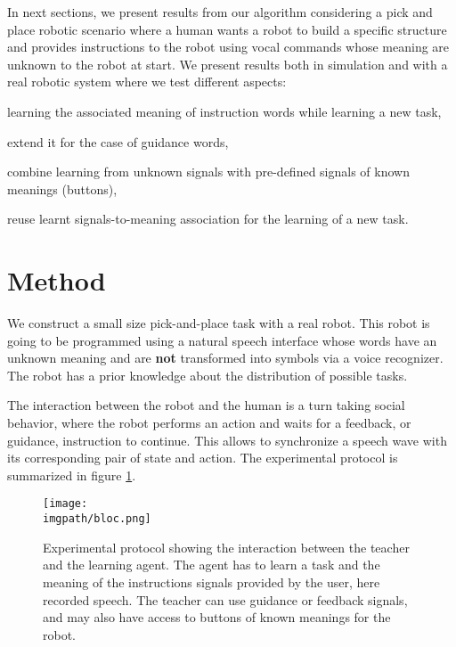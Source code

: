 In next sections, we present results from our algorithm considering a pick and place robotic scenario where a human wants a robot to build a specific structure and provides instructions to the robot using vocal commands whose meaning are unknown to the robot at start. We present results both in simulation and with a real robotic system where we test different aspects: \begin{inparaenum}[a)] \item learning the associated meaning of instruction words while learning a new task, \item extend it for the case of guidance words, \item combine learning from unknown signals with pre-defined signals of known meanings (buttons), \item reuse learnt signals-to-meaning association for the learning of a new task. \end{inparaenum}

\section{Method}

We construct a small size pick-and-place task with a real robot. This robot is going to be programmed using a natural speech interface whose words have an unknown meaning and are \textbf{not} transformed into symbols via a voice recognizer. The robot has a prior knowledge about the distribution of possible tasks.

The interaction between the robot and the human is a turn taking social behavior, where the robot performs an action and waits for a feedback, or guidance, instruction to continue. This allows to synchronize a speech wave with its corresponding pair of state and action. The experimental protocol is summarized in figure \ref{fig:lfui:bloc}.

\begin{figure}[!ht]
  \centering
  \texttt{[image: \\imgpath/bloc.png]}
  \caption{Experimental protocol showing the interaction between the teacher and the learning agent. The agent has to learn a task and the meaning of the instructions signals provided by the user, here recorded speech. The teacher can use guidance or feedback signals, and may also have access to buttons of known meanings for the robot.}
  \label{fig:lfui:bloc}    
\end{figure}

